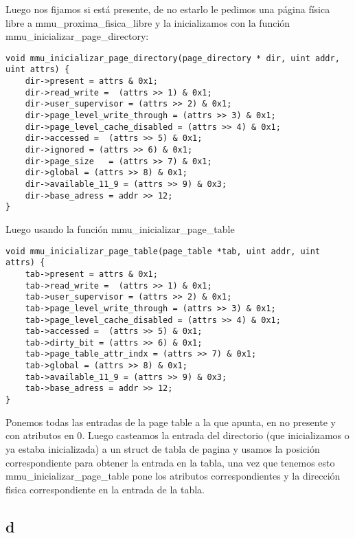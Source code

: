 Luego nos fijamos si está presente, de no estarlo le pedimos una página física libre a mmu\_proxima\_fisica\_libre y la inicializamos con la función mmu\_inicializar\_page\_directory:
\begin{codesnippet}
\begin{verbatim}
void mmu_inicializar_page_directory(page_directory * dir, uint addr, uint attrs) {
    dir->present = attrs & 0x1;
    dir->read_write =  (attrs >> 1) & 0x1;
    dir->user_supervisor = (attrs >> 2) & 0x1;                  
    dir->page_level_write_through = (attrs >> 3) & 0x1;
    dir->page_level_cache_disabled = (attrs >> 4) & 0x1;
    dir->accessed =  (attrs >> 5) & 0x1;
    dir->ignored = (attrs >> 6) & 0x1;
    dir->page_size   = (attrs >> 7) & 0x1;             
    dir->global = (attrs >> 8) & 0x1;
    dir->available_11_9 = (attrs >> 9) & 0x3;
    dir->base_adress = addr >> 12;
}
\end{verbatim}
\end{codesnippet}
\noindent Luego usando la función mmu\_inicializar\_page\_table
\begin{codesnippet}
\begin{verbatim}
void mmu_inicializar_page_table(page_table *tab, uint addr, uint attrs) {
    tab->present = attrs & 0x1;
    tab->read_write =  (attrs >> 1) & 0x1;
    tab->user_supervisor = (attrs >> 2) & 0x1;                  
    tab->page_level_write_through = (attrs >> 3) & 0x1;
    tab->page_level_cache_disabled = (attrs >> 4) & 0x1;
    tab->accessed =  (attrs >> 5) & 0x1;
    tab->dirty_bit = (attrs >> 6) & 0x1;
    tab->page_table_attr_indx = (attrs >> 7) & 0x1;             
    tab->global = (attrs >> 8) & 0x1;
    tab->available_11_9 = (attrs >> 9) & 0x3;
    tab->base_adress = addr >> 12;
}
\end{verbatim}
\end{codesnippet}
 \noindent Ponemos todas las entradas de la page table a la que apunta, en no presente y con atributos en 0. Luego casteamos la entrada del directorio (que inicializamos o ya estaba inicializada) a un struct de tabla de pagina y usamos
 la posición correspondiente para obtener la entrada en la tabla, una vez que tenemos esto mmu\_inicializar\_page\_table pone los atributos correspondientes y la dirección fisica correspondiente en la entrada de la tabla.

\subsection*{d}

